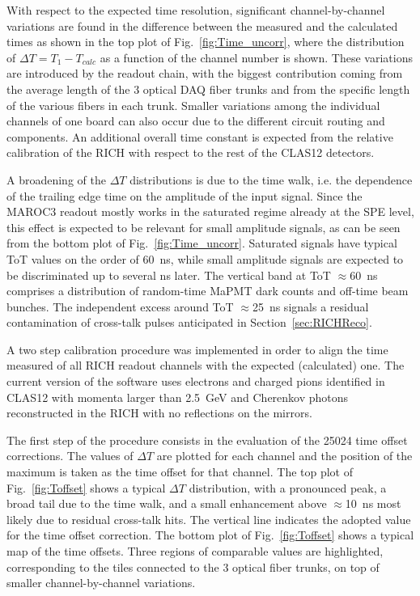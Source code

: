 \documentclass[5p,times,twocolumn]{elsarticle}
\def\MaPMT{MaPMT }
\begin{document}
With respect to the expected time resolution, significant channel-by-channel variations are found in the difference
between the measured and the calculated times as shown in the top plot of Fig.~\ref{fig:Time_uncorr}, where the
distribution of $\Delta T=T_1-T_{calc}$ as a function of the channel number is shown. These variations are introduced
by the readout chain, with the biggest contribution coming from the average length of the 3 optical DAQ fiber trunks and
from the specific length of the various fibers in each trunk. Smaller variations among the individual channels of one
board can also occur due to the different circuit routing and components. An additional overall time constant is
expected from the relative calibration of the RICH with respect to the rest of the CLAS12 detectors.

A broadening of the $\Delta T$ distributions is due to the time walk, i.e. the dependence of the trailing edge time
on the amplitude of the input signal. Since the MAROC3 readout mostly works in the saturated regime already
at the SPE level, this effect is expected to be relevant for small amplitude signals, as can be seen from the bottom
plot of Fig.~\ref{fig:Time_uncorr}. Saturated signals have typical ToT values on the order of 60~ns, while small
amplitude signals are expected to be discriminated up to several ns later. The vertical band at ToT $\approx$60~ns
comprises a distribution of random-time \MaPMT dark counts and off-time beam bunches. The independent excess
around ToT $\approx$25~ns signals a residual contamination of cross-talk pulses anticipated in Section~\ref{sec:RICHReco}.



A two step calibration procedure was implemented in order to align the time measured of all RICH readout
channels with the expected (calculated) one. The current version of the software uses electrons and charged pions
identified in CLAS12 with momenta larger than 2.5~GeV and Cherenkov photons reconstructed in the RICH with
no reflections on the mirrors.

The first step of the procedure consists in the evaluation of the 25024 time offset corrections. The values of
$\Delta T$ are plotted for each channel and the position of the maximum is taken as the time offset for that
channel. The top plot of Fig.~\ref{fig:Toffset} shows a typical $\Delta T$ distribution, with a pronounced peak, a
broad tail due to the time walk, and a small enhancement above $\approx$10~ns most likely due to residual cross-talk
hits. The vertical line indicates the adopted value for the time offset correction. The bottom plot of
Fig.~\ref{fig:Toffset} shows a typical map of the time offsets. Three regions of comparable values are highlighted,
corresponding to the tiles connected to the 3 optical fiber trunks, on top of smaller channel-by-channel variations.
\end{document}
